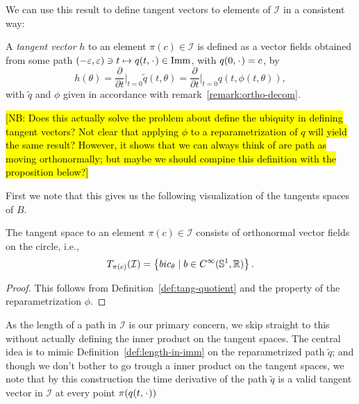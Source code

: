 We can use this result to define tangent vectors to elements of $\mathcal{I}$ in
a consistent way:

\begin{definition}
  \label{def:tang-quotient}
  A \textit{tangent vector} $h$ to an element $\pi(c) \in \mathcal{I}$ is defined as a vector fields obtained from some path $(-\epsilon, \epsilon) \ni t \mapsto q(t, \blank) \in \I$, with $q(0,\blank) = c$, by
  \begin{equation}
    \label{eq:tang-quotient}
    h(\theta) = \frac{\partial }{\partial t} \bigg\vert_{t=0} \tilde{q}(t,\theta)
    = \frac{\partial }{\partial t} \bigg\vert_{t=0} q(t, \phi(t,\theta)),
  \end{equation}
  with $\tilde{q}$ and $\phi$ given in accordance with remark~\ref{remark:ortho-decom}.

  \hl{[NB: Does this actually solve the problem about define the ubiquity in defining tangent vectors? Not clear that applying $\phi$ to a reparametrization of $q$ will yield the same result? However, it shows that we can always think of are path as moving orthonormally; but maybe we should compine this definition with the proposition below?]}
\end{definition}

First we note that this gives us the following visualization of the tangents spaces of $B$.

\begin{proposition}
The tangent space to an element $\pi(c) \in \mathcal{I}$ consists of orthonormal vector fields on the circle, i.e.,
  \begin{equation*}
    T_{\pi(c)}(\mathcal{I}) =
    \left\{
      b i c_{\theta} \mid b \in C^{\infty}(\mathbb{S}^1,\mathbb{R})
    \right\}.
  \end{equation*}
\end{proposition}

\begin{proof}
  This follows from Definition~\ref{def:tang-quotient} and the property of the reparametrization $\phi$.
\end{proof}

As the length of a path in $\mathcal{I}$ is our primary concern, we skip straight to this without actually defining the inner product on the tangent spaces. The central idea is to mimic Definition~\ref{def:length-in-imm} on the reparametrized path $\tilde{q}$; and though we don't bother to go trough a inner product on the tangent spaces, we note that by this construction the time derivative of the path $\tilde{q}$ is a valid tangent vector in $\mathcal{I}$ at every point $\pi(q(t,\blank))$

